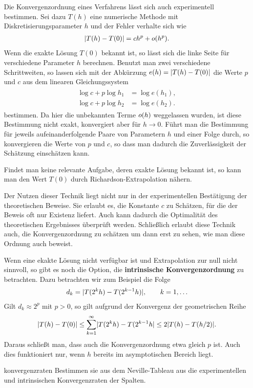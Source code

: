 \begin{remark}
  Die Konvergenzordnung eines
  Verfahrens lässt sich auch experimentell bestimmen. Sei dazu $T(h)$
  eine numerische Methode mit Diskretisierungsparameter $h$ und der
  Fehler verhalte sich wie
  \begin{gather}
    \lvert T(h) - T(0)\rvert = c h^p + o(h^p).
  \end{gather}
  Wenn die exakte Lösung $T(0)$ bekannt ist, so lässt sich die linke
  Seite für verschiedene Parameter $h$ berechnen. Benutzt man zwei
  verschiedene Schrittweiten, so lassen sich mit der Abkürzung
  $e(h) = \lvert T(h) - T(0)\rvert$ die Werte $p$ und $c$ aus dem
  linearen Gleichungssystem
  \begin{gather}
    \begin{aligned}
      \log c + p \log h_1 &= \log e(h_1),\\
      \log c + p \log h_2 &= \log e(h_2).
    \end{aligned}
  \end{gather}
  bestimmen. Da hier die unbekannten Terme $o(h)$ weggelassen
  wurden, ist diese Bestimmung nicht exakt, konvergiert aber für
  $h\to 0$. Führt man die Bestimmung für jeweils aufeinanderfolgende
  Paare von Parametern $h$ und einer Folge durch, so konvergieren die
  Werte von $p$ und $c$, so dass man dadurch die Zuverlässigkeit der
  Schätzung einschätzen kann.

  Findet man keine relevante Aufgabe, deren exakte Lösung bekannt ist,
  so kann man den Wert $T(0)$ durch Richardson-Extrapolation nähern.

  Der Nutzen dieser Technik liegt nicht nur in der experimentellen
  Bestätigung der theoretischen Beweise. Sie erlaubt es, die Konstante
  $c$ zu Schätzen, für die der Beweis oft nur Existenz liefert. Auch
  kann dadurch die Optimalität des theoretischen Ergebnisses überprüft
  werden. Schließlich erlaubt diese Technik auch, die
  Konvergenzordnung zu schätzen um dann erst zu sehen, wie man diese
  Ordnung auch beweist.
\end{remark}

\begin{remark}
  Wenn eine ekakte Lösung nicht verfügbar ist und Extrapolation zur
  null nicht sinnvoll, so gibt es noch die Option, die
  \textbf{intrinsische
    Konvergenzordnung} zu
  betrachten. Dazu betrachten wir zum Beispiel die Folge
  \begin{gather}
    d_k = \lvert T(2^kh) - T(2^{k-1}h)\rvert, \qquad k=1,\dots
  \end{gather}
  Gilt $d_k \approx 2^p$ mit $p>0$, so gilt aufgrund der Konvergenz
  der geometrischen Reihe
  \begin{gather}
    \lvert T(h)-T(0)\rvert \le \sum_{k=1}^\infty \lvert T(2^kh) - T(2^{k-1}h\rvert
    \le 2 \lvert T(h)-T(h/2)\rvert.
  \end{gather}
  Daraus schließt man, dass auch die Konvergenzordnung etwa gleich $p$
  ist. Auch dies funktioniert nur, wenn $h$ bereits im asymptotischen
  Bereich liegt.
\end{remark}

\begin{Aufgabe}{konvergenzraten}
  Bestimmen sie aus dem Neville-Tableau aus
   die experimentellen und intrinsischen
  Konvergenzraten der Spalten.
\end{Aufgabe}

